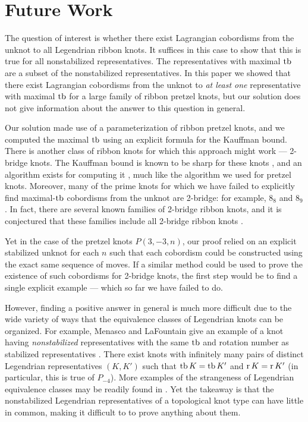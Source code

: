 \chapter{Future Work}\label{ch:future}

The question of interest is whether there exist Lagrangian cobordisms from the unknot to all Legendrian ribbon knots. It suffices in this case to show that this is true for all nonstabilized representatives. The representatives with maximal $\operatorname{tb}$ are a subset of the nonstabilized representatives.
In this paper we showed that there exist Lagrangian cobordisms from the unknot to \emph{at least one} representative with maximal $\operatorname{tb}$ for a large family of ribbon pretzel knots, but our solution does not give information about the answer to this question in general. 

Our solution made use of a parameterization of ribbon pretzel knots, and we computed the maximal $\operatorname{tb}$ using an explicit formula for the Kauffman bound. There is another class of ribbon knots for which this approach might work --- 2-bridge knots.
The Kauffman bound is known to be sharp for these knots \cite{ng}, and an algorithm exists for computing it \cite{luzhong-2bridge}, much like the algorithm we used for pretzel knots.
Moreover, many of the prime knots for which we have failed to explicitly find maximal-$\operatorname{tb}$ cobordisms from the unknot are 2-bridge: for example, $8_8$ and $8_9$. In fact, there are several known families of 2-bridge ribbon knots, and it is conjectured that these families include all 2-bridge ribbon knots \cite{lamm}.

Yet in the case of the pretzel knots $P(3, -3, n)$, our proof relied on an explicit stabilized unknot for each $n$ such that each cobordism could be constructed using the exact same sequence of moves.
If a similar method could be used to prove the existence of such cobordisms for 2-bridge knots, the first step would be to find a single explicit example --- which so far we have failed to do.

However, finding a positive answer in general is much more difficult due to the wide variety of ways that the equivalence classes of Legendrian knots can be organized. For example, Menasco and LaFountain give an example of a knot having \emph{nonstabilized} representatives with the same $\operatorname{tb}$ and rotation number as stabilized representatives \cite{mountain}. There exist knots with infinitely many pairs of distinct Legendrian representatives $(K, K')$ such that $\operatorname{tb} K = \operatorname{tb} K'$ and $\operatorname{r} K = \operatorname{r} K'$ (in particular, this is true of $P_{-4}$). More examples of the strangeness of Legendrian equivalence classes may be readily found in \cite{atlas}. Yet the takeaway is that the nonstabilized Legendrian representatives of a topological knot type can have little in common, making it difficult to to prove anything about them.


